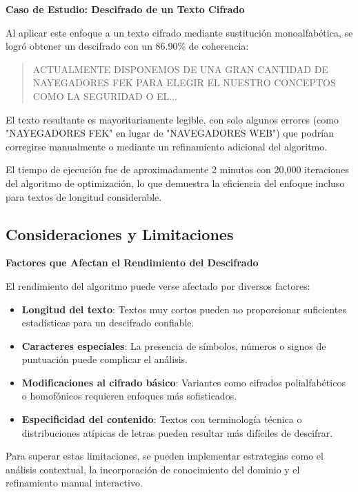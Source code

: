\begin{securitygoodpractice}
\textbf{Caso de Estudio: Descifrado de un Texto Cifrado}

Al aplicar este enfoque a un texto cifrado mediante sustitución monoalfabética, se logró obtener un descifrado con un 86.90\% de coherencia:

\begin{quote}
ACTUALMENTE DISPONEMOS DE UNA GRAN CANTIDAD DE NAYEGADORES FEK PARA ELEGIR EL NUESTRO CONCEPTOS COMO LA SEGURIDAD O EL...
\end{quote}

El texto resultante es mayoritariamente legible, con solo algunos errores (como "NAYEGADORES FEK" en lugar de "NAVEGADORES WEB") que podrían corregirse manualmente o mediante un refinamiento adicional del algoritmo.

El tiempo de ejecución fue de aproximadamente 2 minutos con 20,000 iteraciones del algoritmo de optimización, lo que demuestra la eficiencia del enfoque incluso para textos de longitud considerable.
\end{securitygoodpractice}

\subsection{Consideraciones y Limitaciones}

\begin{securitywarning}
\textbf{Factores que Afectan el Rendimiento del Descifrado}

El rendimiento del algoritmo puede verse afectado por diversos factores:

\begin{itemize}
    \item \textbf{Longitud del texto}: Textos muy cortos pueden no proporcionar suficientes estadísticas para un descifrado confiable.
    \item \textbf{Caracteres especiales}: La presencia de símbolos, números o signos de puntuación puede complicar el análisis.
    \item \textbf{Modificaciones al cifrado básico}: Variantes como cifrados polialfabéticos o homofónicos requieren enfoques más sofisticados.
    \item \textbf{Especificidad del contenido}: Textos con terminología técnica o distribuciones atípicas de letras pueden resultar más difíciles de descifrar.
\end{itemize}

Para superar estas limitaciones, se pueden implementar estrategias como el análisis contextual, la incorporación de conocimiento del dominio y el refinamiento manual interactivo.
\end{securitywarning}

